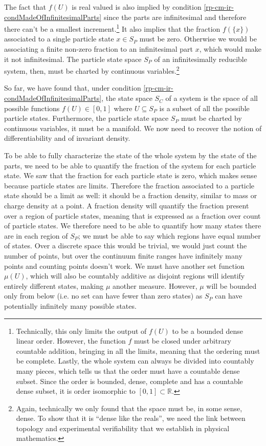The fact that $f(U)$ is real valued is also implied by condition \ref{rp-cm-ir-condMadeOfInfinitesimalParts} since the parts are infinitesimal and therefore there can't be a smallest increment.\footnote{Technically, this only limits the output of $f(U)$ to be a bounded dense linear order. However, the function $f$ must be closed under arbitrary countable addition, bringing in all the limits, meaning that the ordering must be complete. Lastly, the whole system can always be divided into countably many pieces, which tells us that the order must have a countable dense subset. Since the order is bounded, dense, complete and has a countable dense subset, it is order isomorphic to $[0, 1] \subset \mathbb{R}$.} It also implies that the fraction $f(\{x\})$ associated to a single particle state $x \in S_P$ must be zero. Otherwise we would be associating a finite non-zero fraction to an infinitesimal part $x$, which would make it not infinitesimal. The particle state space $S_P$ of an infinitesimally reducible system, then, must be charted by continuous variables.\footnote{Again, technically we only found that the space must be, in some sense, dense. To show that it is ``dense like the reals'', we need the link between topology and experimental verifiability that we establish in physical mathematics.}

So far, we have found that, under condition \ref{rp-cm-ir-condMadeOfInfinitesimalParts}, the state space $S_C$ of a system is the space of all possible functions $f(U) \in [0,1]$ where $U \subseteq S_P$ is a subset of all the possible particle states. Furthermore, the particle state space $S_P$ must be charted by continuous variables, it must be a manifold. We now need to recover the notion of differentiability and of invariant density.

To be able to fully characterize the state of the whole system by the state of the parts, we need to be able to quantify the fraction of the system for each particle state. We saw that the fraction for each particle state is zero, which makes sense because particle states are limits. Therefore the fraction associated to a particle state should be a limit as well: it should be a fraction density, similar to mass or charge density at a point. A fraction density will quantify the fraction present over a region of particle states, meaning that is expressed as a fraction over count of particle states. We therefore need to be able to quantify how many states there are in each region of $S_P$; we must be able to say which regions have equal number of states. Over a discrete space this would be trivial, we would just count the number of points, but over the continuum finite ranges have infinitely many points and counting points doesn't work. We must have another set function $\mu(U)$, which will also be countably additive as disjoint regions will identify entirely different states, making $\mu$ another measure. However, $\mu$ will be bounded only from below (i.e. no set can have fewer than zero states) as $S_P$ can have potentially infinitely many possible states.

